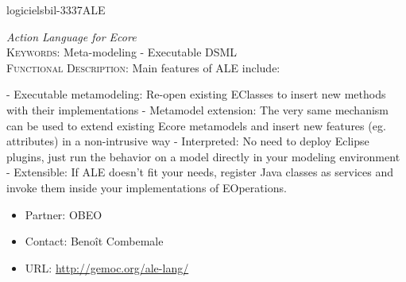 \documentclass{ra2018}
\begin{document}
 \begin{module}{logiciels}{bil-3337}{ALE}

 \textit{Action Language for Ecore} \\ 


   \textsc{Keywords:} Meta-modeling - Executable DSML \\ 


   

 \textsc{Functional Description:}  Main features of ALE include:

- Executable metamodeling: Re-open existing EClasses to insert new methods with their implementations
- Metamodel extension: The very same mechanism can be used to extend existing Ecore metamodels and insert new features (eg. attributes) in a non-intrusive way
-    Interpreted: No need to deploy Eclipse plugins, just run the behavior on a model directly in your modeling environment
-    Extensible: If ALE doesn’t fit your needs, register Java classes as services and invoke them inside your implementations of EOperations.\\

   \begin{itemize}
      \item Partner: OBEO
      \item Contact: Benoît Combemale
      \item URL: \url{http://gemoc.org/ale-lang/}
   \end{itemize}

 \end{module}
\end{document}
